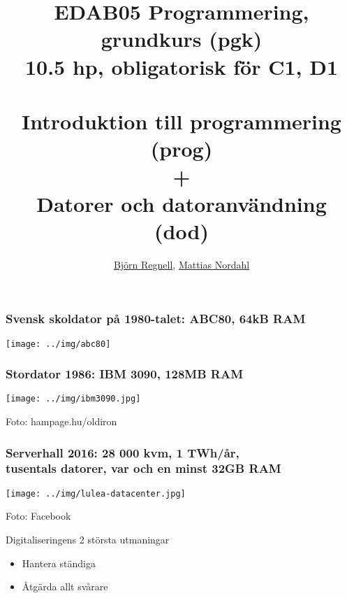 \documentclass{lecturesimple}
\title[Kort presentation av pgk \& dod, \DateOfShow]{
EDAB05 Programmering, grundkurs (pgk)\\10.5 hp, obligatorisk för C1, D1\\ ~ \\  
Introduktion till programmering (prog) \\ + \\ Datorer och datoranvändning (dod)}
\author{\href{https://lunduniversity.github.io/bjornregnell}{Björn Regnell}, \href{https://cs.lth.se/nordahl-mattias/}{Mattias Nordahl}}
\institute{\href{https://cs.lth.se}{Datavetenskap}, LTH}
\date{\DateOfShow}
\begin{document}
\frame{\titlepage}

\begin{frame}\frametitle{Svensk skoldator på 1980-talet: ABC80, 64kB RAM}
  \begin{center}
      \texttt{[image: ../img/abc80]}
  \end{center}
  \end{frame}
  
  
  \begin{frame}\frametitle{Stordator 1986: IBM 3090, %
      128MB RAM}
  \begin{center}
      \texttt{[image: ../img/ibm3090.jpg]}
    
      {\fontsize{5}{5}\selectfont\color{gray}
      Foto: hampage.hu/oldiron
    }
  \end{center}
  \end{frame}
    
  \begin{frame}\frametitle{Serverhall 2016: 28 000 kvm, 1 TWh/år, \\tusentals datorer, var och en minst 32GB RAM}
    \begin{center}
      \texttt{[image: ../img/lulea-datacenter.jpg]}
    
      {\fontsize{5}{5}\selectfont\color{gray}
    Foto: Facebook
    }
    \end{center}
  \end{frame}
  


\begin{Slide}{Digitaliseringens 2 största utmaningar}
  \begin{itemize}\Large
    \item Hantera ständiga 
    \item Åtgärda allt svårare  
  \end{itemize}  
\end{Slide}


\end{document}
